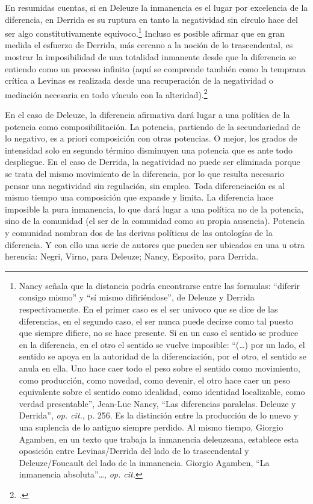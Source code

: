 \documentclass{book}
\begin{document}
En resumidas cuentas, si en Deleuze la inmanencia es el lugar por
excelencia de la diferencia, en Derrida es su ruptura en tanto la
negatividad sin círculo hace del ser algo constitutivamente
equívoco.\footnote{Nancy señala que la distancia podría encontrarse entre
  las formulas: \enquote{diferir consigo mismo} y \enquote{sí mismo difiriéndose}, de
  Deleuze y Derrida respectivamente. En el primer caso es el ser univoco
  que se dice de las diferencias, en el segundo caso, el ser nunca puede
  decirse como tal puesto que siempre difiere, no se hace presente. Si
  en un caso el sentido se produce en la diferencia, en el otro el
  sentido se vuelve imposible: \enquote{(\dots) por un lado, el sentido se
  apoya en la autoridad de la diferenciación, por el otro, el sentido se
  anula en ella. Uno hace caer todo el peso sobre el sentido como
  movimiento, como producción, como novedad, como devenir, el otro hace
  caer un peso equivalente sobre el sentido como idealidad, como
  identidad localizable, como verdad presentable}, Jean-Luc Nancy, \enquote{Las
  diferencias paralelas. Deleuze y Derrida}, \emph{op. cit.}, p. 256. Es
  la distinción entre la producción de lo nuevo y una suplencia de lo
  antiguo siempre perdido. Al mismo tiempo, Giorgio Agamben, en un texto
  que trabaja la inmanencia deleuzeana, establece esta oposición entre
  Levinas/Derrida del lado de lo trascendental y Deleuze/Foucault del
  lado de la inmanencia. Giorgio Agamben, \enquote{La inmanencia
  absoluta}\ldots, \emph{op. cit.}} Incluso es posible afirmar que en
gran medida el esfuerzo de Derrida, más cercano a la noción de lo
trascendental, es mostrar la imposibilidad de una totalidad inmanente
desde que la diferencia se entiendo como un proceso infinito (aquí se
comprende también como la temprana crítica a Levinas es realizada desde
una recuperación de la negatividad o mediación necesaria en todo vínculo
con la alteridad).\footcite{derrida1989c}

En el caso de Deleuze, la diferencia afirmativa dará lugar a una
política de la potencia como composibilitación. La potencia, partiendo
de la secundariedad de lo negativo, es a priori composición con otras
potencias. O mejor, los grados de intensidad solo en segundo término
disminuyen una potencia que es ante todo despliegue. En el caso de
Derrida, la negatividad no puede ser eliminada porque se trata del mismo
movimiento de la diferencia, por lo que resulta necesario pensar una
negatividad sin regulación, sin empleo. Toda diferenciación es al mismo
tiempo una composición que expande y limita. La diferencia hace
imposible la pura inmanencia, lo que dará lugar a una política no de la
potencia, sino de la comunidad (el ser de la comunidad como su propia
ausencia). Potencia y comunidad nombran dos de las derivas políticas de
las ontologías de la diferencia. Y con ello una serie de autores que
pueden ser ubicados en una u otra herencia: Negri, Virno, para Deleuze;
Nancy, Esposito, para Derrida.
\end{document}
